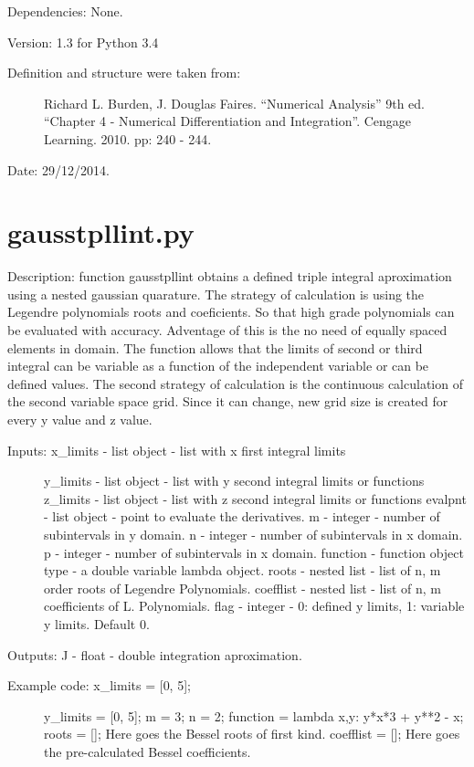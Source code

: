 \documentclass[letterpaper,10pt,oneside]{sphinxmanual}
\theoremstyle{plain}%
\theoremstyle{definition}%
\theoremstyle{remark}%
\begin{document}
Dependencies: None.

Version: 1.3 for Python 3.4
\begin{description}
\item[{Definition and structure were taken from:}] \leavevmode
Richard L. Burden, J. Douglas Faires. ``Numerical Analysis'' 9th ed.
``Chapter 4 - Numerical Differentiation and Integration''. 
Cengage Learning. 2010. pp: 240 - 244.

\end{description}




Date: 29/12/2014.


\section{gausstpllint.py}
\label{code:module-gausstpllint}\label{code:gausstpllint-py}
Description: function gausstpllint obtains a defined triple integral 
aproximation using a nested gaussian quarature. The strategy of calculation
is using the Legendre polynomials roots and coeficients. So that high grade 
polynomials can be evaluated with accuracy. Adventage of this is the no need
of equally spaced elements in domain. The function allows that the limits of 
second or third integral can be variable as a function of the independent 
variable or can be defined values. The second strategy of calculation is 
the continuous calculation of the second variable space grid. Since it can 
change, new grid size is created for every y value and z value.
\begin{description}
\item[{Inputs: x\_limits - list object - list with x first integral limits}] \leavevmode
y\_limits - list object - list with y second integral limits or functions
z\_limits - list object - list with z second integral limits or functions
evalpnt - list object - point to evaluate the derivatives.
m - integer - number of subintervals in y domain.
n - integer - number of subintervals in x domain.
p - integer - number of subintervals in x domain.
function - function object type - a double variable lambda object.
roots - nested list - list of n, m order roots of Legendre Polynomials.
coefflist - nested list - list of n, m coefficients of L. Polynomials.
flag - integer - 0: defined y limits, 1: variable y limits. Default 0.

\end{description}

Outputs: J - float - double integration aproximation.
\begin{description}
\item[{Example code: x\_limits = {[}0, 5{]};}] \leavevmode
y\_limits = {[}0, 5{]};
m = 3;
n = 2;
function = lambda x,y: y*x*3 + y**2 - x;
roots = {[}{]}; Here goes the Bessel roots of first kind.
coefflist = {[}{]}; Here goes the pre-calculated Bessel coefficients.

\end{description}
\end{document}
